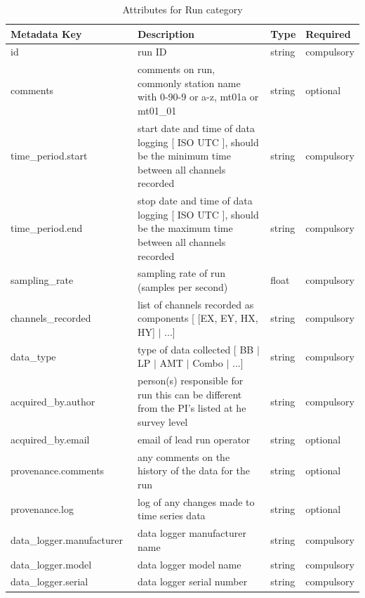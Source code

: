 \documentclass{article}
\begin{document}
\begin{table}[htb!]
    \caption[Attributes for Run]{Attributes for Run category}
    \begin{tabular}{|l|p{3.2in}|l|l|}
        \hline
        \textbf{Metadata Key} & \textbf{Description} & \textbf{Type} & \textbf{Required} \\ \hline
        id\ & run ID & string & compulsory \\ \hline
        comments\ & comments on run, commonly station name with {0-9}{0-9} or {a-z}, mt01a or mt01\_01 & string & optional \\ \hline
        time\_period.start\ & start date and time of data logging [ ISO UTC ], should be the minimum time between all channels recorded & string & compulsory \\ \hline
        time\_period.end\ & stop date and time of data logging [ ISO UTC ], should be the maximum time between all channels recorded & string & compulsory \\ \hline
        sampling\_rate\ & sampling rate of run (samples per second) & float & compulsory \\ \hline
        channels\_recorded\ & list of channels recorded as components [ [EX, EY, HX, HY] $|$ ...] & string & compulsory \\ \hline
        data\_type \ & type of data collected [ BB $|$ LP $|$ AMT $|$ Combo $|$ ...] & string & compulsory \\ \hline
        acquired\_by.author\ & person(s) responsible for run this can be different from the PI's listed at he survey level & string & compulsory \\ \hline
        acquired\_by.email\ & email of lead run operator & string & optional \\ \hline
        provenance.comments\ & any comments on the history of the data for the run & string & optional \\ \hline
        provenance.log\ & log of any changes made to time series data & string & optional \\ \hline
        data\_logger.manufacturer\ & data logger manufacturer name & string & compulsory \\ \hline
        data\_logger.model\ & data logger model name & string & compulsory \\ \hline
        data\_logger.serial\ & data logger serial number & string & compulsory \\ \hline

\end{tabular}
\end{table}
\end{document}
